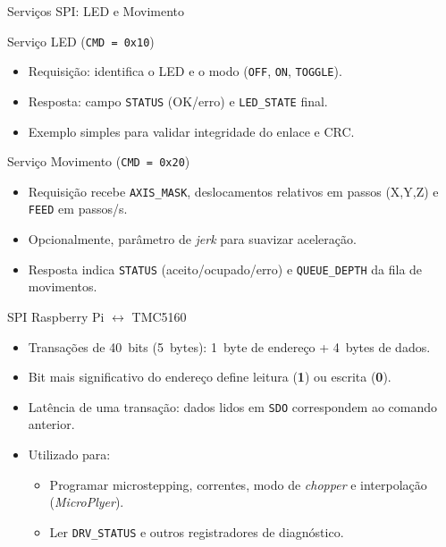\documentclass{beamer}
\begin{document}
\begin{frame}{Serviços SPI: LED e Movimento}
  \begin{block}{Serviço LED (\texttt{CMD = 0x10})}
    \begin{itemize}
      \item Requisição: identifica o LED e o modo (\texttt{OFF}, \texttt{ON}, \texttt{TOGGLE}).
      \item Resposta: campo \texttt{STATUS} (OK/erro) e \texttt{LED\_STATE} final.
      \item Exemplo simples para validar integridade do enlace e CRC.
    \end{itemize}
  \end{block}
  \vspace{0.4em}
  \begin{block}{Serviço Movimento (\texttt{CMD = 0x20})}
    \begin{itemize}
      \item Requisição recebe \texttt{AXIS\_MASK}, deslocamentos relativos em passos (X,Y,Z) e \texttt{FEED} em passos/s.
      \item Opcionalmente, parâmetro de \emph{jerk} para suavizar aceleração.
      \item Resposta indica \texttt{STATUS} (aceito/ocupado/erro) e \texttt{QUEUE\_DEPTH} da fila de movimentos.
    \end{itemize}
  \end{block}
\end{frame}

\begin{frame}{SPI Raspberry Pi $\leftrightarrow$ TMC5160}
  \begin{itemize}
    \item Transações de 40~bits (5~bytes): 1~byte de endereço + 4~bytes de dados.
    \item Bit mais significativo do endereço define leitura (\textbf{1}) ou escrita (\textbf{0}).
    \item Latência de uma transação: dados lidos em \texttt{SDO} correspondem ao comando anterior.
    \item Utilizado para:
      \begin{itemize}
        \item Programar microstepping, correntes, modo de \emph{chopper} e interpolação (\emph{MicroPlyer}).
        \item Ler \texttt{DRV\_STATUS} e outros registradores de diagnóstico.
      \end{itemize}
  \end{itemize}
\end{frame}
\end{document}

